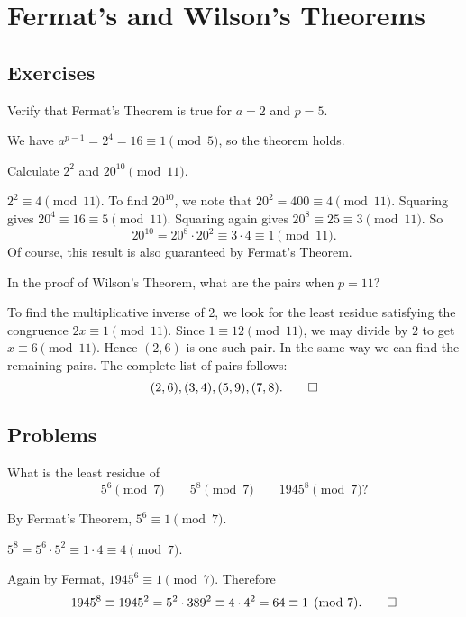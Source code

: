 \chapter{Fermat's and Wilson's Theorems}

\section{Exercises}

 Verify that Fermat's Theorem is true for $a = 2$ and $p = 5$.
\begin{solution}
  We have $a^{p-1} = 2^4 = 16 \equiv 1 \pmod 5$, so the theorem holds.
\end{solution}

 Calculate $2^2$ and $20^{10}\pmod{11}$.
\begin{solution}
  $2^2\equiv4\pmod{11}$. To find $20^{10}$, we note that
  $20^2 = 400 \equiv 4\pmod{11}$. Squaring gives
  $20^4\equiv16\equiv5\pmod{11}$. Squaring again gives
  $20^8\equiv25\equiv3\pmod{11}$. So
  \begin{equation*}
    20^{10} = 20^8\cdot20^2 \equiv 3\cdot4 \equiv 1 \pmod{11}.
  \end{equation*}
  Of course, this result is also guaranteed by Fermat's Theorem.
\end{solution}

 In the proof of Wilson's Theorem, what are the pairs when
$p = 11$?
\begin{solution}
  To find the multiplicative inverse of $2$, we look for the least
  residue satisfying the congruence $2x\equiv1\pmod{11}$. Since
  $1\equiv12\pmod{11}$, we may divide by $2$ to get
  $x\equiv6\pmod{11}$. Hence $(2,6)$ is one such pair. In the same way
  we can find the remaining pairs. The complete list of pairs follows:
  \begin{equation*}
    (2,6), (3,4), (5,9), (7,8). \qedhere
  \end{equation*}
\end{solution}

\section{Problems}

 What is the least residue of
\begin{equation*}
  5^6\pmod7 \qquad 5^8\pmod7 \qquad 1945^8\pmod7?
\end{equation*}
\begin{solution}
  By Fermat's Theorem, $5^6\equiv1\pmod7$.

  $5^8 = 5^6\cdot5^2 \equiv 1\cdot4 \equiv 4\pmod7$.

  Again by Fermat, $1945^6\equiv1\pmod7$. Therefore
  \begin{equation*}
    1945^8\equiv1945^2
    = 5^2\cdot389^2 \equiv 4\cdot4^2 = 64\equiv1\pmod7.
    \qedhere
  \end{equation*}
\end{solution}

